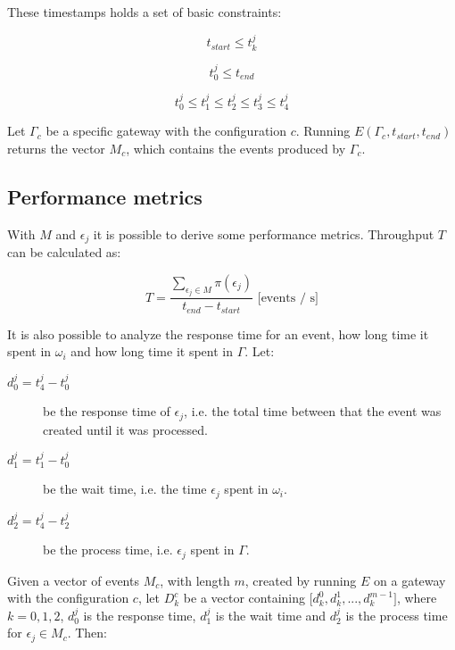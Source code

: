 These timestamps holds a set of basic constraints:

\begin{equation}
t_{start} \leq t_k^j
\end{equation}

\begin{equation} \label{eq:t_0}
t_0^j \leq t_{end}
\end{equation}

\begin{equation}
t_0^j \leq t_1^j \leq t_2^j \leq t_3^j \leq t_4^j
\end{equation}

Let $\Gamma_c$ be a specific gateway with the configuration $c$.  Running
$E(\Gamma_c, t_{start}, t_{end})$ returns the vector $M_c$, which contains the
events produced by $\Gamma_c$.

\subsection{Performance metrics}
\label{sec:performance_metrics}

With $M$ and $\epsilon_j$ it is possible to derive some performance metrics.
Throughput $T$ can be calculated as:

$$
T = \frac{\sum_{\epsilon_j \in M}{\pi(\epsilon_j)}}{t_{end} - t_{start}}
\text{ [events / s]}
$$

It is also possible to analyze the response time for an event, how long time it
spent in $\omega_i$ and how long time it spent in $\Gamma$. Let:

\begin{description}

    \item[$d_0^j = t_4^j - t_0^j$] be the response time of $\epsilon_j$, i.e. the
        total time between that the event was created until it was processed.

    \item[$d_1^j = t_1^j - t_0^j$] be the wait time, i.e. the time $\epsilon_j$
        spent in $\omega_i$.

    \item[$d_2^j = t_4^j - t_2^j$] be the process time, i.e. $\epsilon_j$ spent
        in $\Gamma$.

\end{description}

Given a vector of events $M_c$, with length $m$, created by running $E$ on a
gateway with the configuration $c$, let $D_k^c$ be a vector containing $\big[
    d_k^0, d_k^1, ..., d_k^{m-1} \big]$, where $k = 0, 1, 2$, $d_0^j$ is the
response time, $d_1^j$ is the wait time and $d_2^j$ is the process time for
$\epsilon_j \in M_c$. Then:

